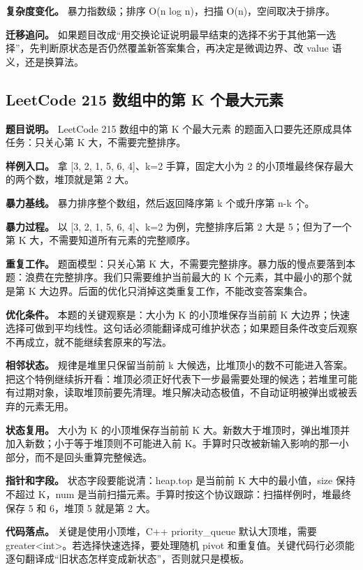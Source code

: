 \textbf{复杂度变化。} 暴力指数级；排序 O(n log n)，扫描 O(n)，空间取决于排序。

\textbf{迁移追问。} 如果题目改成“用交换论证说明最早结束的选择不劣于其他第一选择”，先判断原状态是否仍然覆盖新答案集合，再决定是微调边界、改 value 语义，还是换算法。

\subsection{LeetCode 215 数组中的第 K 个最大元素}

\textbf{题目说明。} LeetCode 215 数组中的第 K 个最大元素 的题面入口要先还原成具体任务：只关心第 K 大，不需要完整排序。

\textbf{样例入口。} 拿 [3, 2, 1, 5, 6, 4]、k=2 手算，固定大小为 2 的小顶堆最终保存最大的两个数，堆顶就是第 2 大。

\textbf{暴力基线。} 暴力排序整个数组，然后返回降序第 k 个或升序第 n-k 个。

\textbf{暴力过程。} 以 [3, 2, 1, 5, 6, 4]、k=2 为例，完整排序后第 2 大是 5；但为了一个第 K 大，不需要知道所有元素的完整顺序。

\textbf{重复工作。} 题面模型：只关心第 K 大，不需要完整排序。暴力版的慢点要落到本题：浪费在完整排序。我们只需要维护当前最大的 K 个元素，其中最小的那个就是第 K 大边界。后面的优化只消掉这类重复工作，不能改变答案集合。

\textbf{优化条件。} 本题的关键观察是：大小为 K 的小顶堆保存当前前 K 大边界；快速选择可做到平均线性。这句话必须能翻译成可维护状态；如果题目条件改变后观察不再成立，就不能继续套原来的写法。

\textbf{相邻状态。} 规律是堆里只保留当前前 k 大候选，比堆顶小的数不可能进入答案。把这个特例继续拆开看：堆顶必须正好代表下一步最需要处理的候选；若堆里可能有过期对象，读取堆顶前要先清理。堆只解决动态极值，不自动证明被弹出或被丢弃的元素无用。

\textbf{状态复用。} 大小为 K 的小顶堆保存当前前 K 大。新数大于堆顶时，弹出堆顶并加入新数；小于等于堆顶则不可能进入前 K。手算时只改被新输入影响的那一小部分，而不是回头重算完整候选。

\textbf{指针和字段。} 状态字段要能说清：heap.top 是当前前 K 大中的最小值，size 保持不超过 K，num 是当前扫描元素。手算时按这个协议跟踪：扫描样例时，堆最终保存 5 和 6，堆顶 5 就是第 2 大。

\textbf{代码落点。} 关键是使用小顶堆，C++ priority\_queue 默认大顶堆，需要 greater<int>。若选择快速选择，要处理随机 pivot 和重复值。关键代码行必须能逐句翻译成“旧状态怎样变成新状态”，否则就只是模板。

